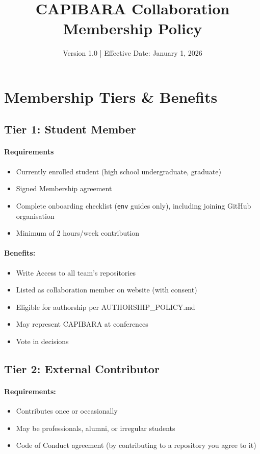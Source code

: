\documentclass[11pt,a4paper]{article}
\title{CAPIBARA Collaboration Membership Policy}
\author{}
\date{Version 1.0 | Effective Date: January 1, 2026}
\begin{document}
\maketitle

\section{Membership Tiers \& Benefits}

\subsection{Tier 1: Student Member}
\paragraph{Requirements}
\begin{itemize}
\item Currently enrolled student (high school undergraduate, graduate)
\item Signed Membership agreement
\item Complete onboarding checklist (\texttt{env} guides only), including joining GitHub organisation
\item Minimum of 2 hours/week contribution
\end{itemize}

\paragraph{Benefits:}
\begin{itemize}
\item Write Access to all team's repositories
\item Listed as collaboration member on website (with consent)
\item Eligible for authorship per AUTHORSHIP\_POLICY.md
\item May represent CAPIBARA at conferences
\item Vote in decisions
\end{itemize}

\subsection{Tier 2: External Contributor}
\paragraph{Requirements:}
\begin{itemize}
\item Contributes once or occasionally
\item May be professionals, alumni, or irregular students
\item Code of Conduct agreement (by contributing to a repository you agree to it)
\end{itemize}
\end{document}
